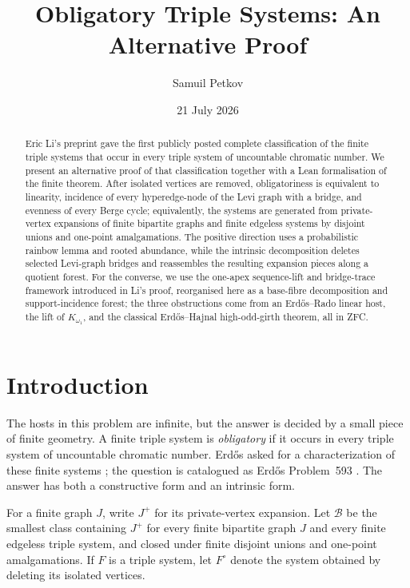 \documentclass[a4paper,11pt,reqno]{amsart}
\title[Obligatory triple systems]{Obligatory Triple Systems: An Alternative Proof}
\author{Samuil Petkov}
\date{21 July 2026}
\theoremstyle{plain}
\theoremstyle{definition}
\theoremstyle{remark}
\begin{document}
\begin{abstract}
Eric Li's preprint gave the first publicly posted complete classification of
the finite triple systems that occur in every triple system of uncountable
chromatic number.  We present
an alternative proof of that classification together with a Lean
formalisation of the finite theorem.  After isolated vertices are removed,
obligatoriness is equivalent to linearity, incidence of every hyperedge-node
of the Levi graph with a bridge, and evenness of every Berge cycle;
equivalently, the systems are generated from private-vertex expansions of
finite bipartite graphs and finite edgeless systems by disjoint unions and
one-point amalgamations.  The positive direction uses a probabilistic rainbow
lemma and rooted abundance, while the intrinsic decomposition deletes
selected Levi-graph bridges and reassembles the resulting expansion pieces
along a quotient forest.  For the converse, we use the one-apex sequence-lift
and bridge-trace framework introduced in Li's proof, reorganised here as a
base-fibre decomposition and support-incidence forest; the three obstructions
come from an Erdős--Rado linear host, the lift of $K_{\omega_1}$, and the
classical Erdős--Hajnal high-odd-girth theorem, all in ZFC.
\end{abstract}

\maketitle

\section*{Introduction}\label{introduction}

The hosts in this problem are infinite, but the answer is decided by a small
piece of finite geometry.  A finite triple system is \emph{obligatory} if it
occurs in every triple system of uncountable chromatic number.  Erdős asked for a characterization
of these finite systems \citep{erdos1995}; the question is catalogued as
Erdős Problem~593 \citep{bloom593}.  The answer has both a constructive form
and an intrinsic form.

For a finite graph $J$, write $J^+$ for its private-vertex expansion.  Let
$\mathcal B$ be the smallest class containing $J^+$ for every finite
bipartite graph $J$ and every finite edgeless triple system, and closed under
finite disjoint unions and one-point amalgamations.  If $F$ is a triple
system, let $F^\circ$ denote the system obtained by deleting its isolated
vertices.
\end{document}
